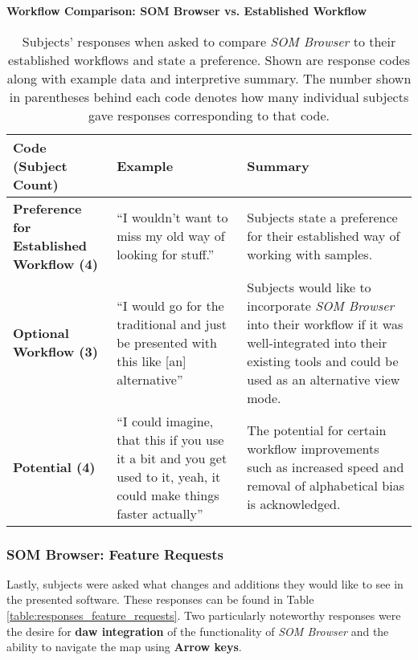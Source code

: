 \begin{table}[!htb]
  \renewcommand{\arraystretch}{1.2}
  \centering
  \textbf{Workflow Comparison: SOM Browser vs. Established Workflow} \\ [3mm]
  \footnotesize
  \colorbox{light-bg}{
  \begin{tabular}{ p{4.0cm} p{4.75cm} p{4.75cm} }
    \hline
    \textbf{Code (Subject Count)} & \textbf{Example} & \textbf{Summary} \\
    \hline
    \textbf{Preference for Established Workflow (4)}
    &
    ``I wouldn't want to miss my old way of looking for stuff.''
    &
    Subjects state a preference for their established way of working with
    samples.
    \\
    \textbf{Optional Workflow (3)}
    &
    ``I would go for the traditional and just be presented with this like [an]
    alternative''
    &
    Subjects would like to incorporate \textit{SOM Browser} into their workflow
    if it was well-integrated into their existing tools and could be used as an
    alternative view mode.
    \\
    \textbf{Potential (4)}
    &
    ``I could imagine, that this if you use it a bit and you get used to it,
    yeah, it could make things faster actually''
    &
    The potential for certain workflow improvements such as increased speed and
    removal of alphabetical bias is acknowledged.
    \\
  \end{tabular}}
  \caption[Workflow Comparison: \textit{SOM Browser} vs. Established Workflow]
  {Subjects' responses when asked to compare \textit{SOM Browser} to their
  established workflows and state a preference. Shown are response codes along
  with example data and interpretive summary. The number shown in parentheses
  behind each code denotes how many individual subjects gave responses
  corresponding to that code.}
  \label{table:responses_workflow_comparison}
\end{table}


\subsubsection{SOM Browser: Feature Requests}
\label{subsubsec:feature_requests}
Lastly, subjects were asked what changes and additions they would like to see in
the presented software. These responses can be found in Table
\ref{table:responses_feature_requests}. Two particularly noteworthy responses
were the desire for \textbf{\gls{daw} integration} of the functionality of
\textit{SOM Browser} and the ability to navigate the map using
\textbf{Arrow keys}.


